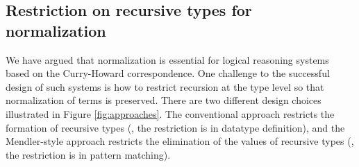 \subsection{Restriction on recursive types for normalization}
\label{sec:relwork:other}
We have argued that normalization is essential for logical reasoning systems
based on the Curry-Howard correspondence. One challenge to the successful
design of such systems is how to restrict recursion at the type level
so that normalization of terms is preserved. 
There are two different
design choices illustrated in Figure \ref{fig:approaches}. 
The conventional approach restricts the formation
of recursive types (\ie, the restriction is in datatype definition), and
the Mendler-style approach restricts the elimination
of the values of recursive types (\ie, the restriction is in pattern matching).

